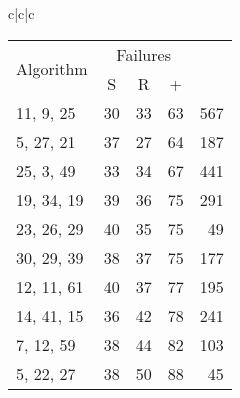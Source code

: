 \documentclass{acmsmalltr}
\newcommand{\xst}[3]{#1, #2, #3}
\begin{document}
\begin{sidewaystable}
{\begin{tabular}{c|c|c}
\begin{tabular}{l|rr|r|r}
\multirow{2}{*}{Algorithm} & \multicolumn{3}{c|}{Failures}  & \multirow{2}{*}{}\\
& \multicolumn{1}{c}{S} & \multicolumn{1}{c|}{R} & \multicolumn{1}{c|}{+} \\
\hline
\xst{11}{9}{25} & 30 & 33 & 63 & 567\\
\xst{5}{27}{21} & 37 & 27 & 64 & 187\\
\xst{25}{3}{49} & 33 & 34 & 67 & 441\\
\xst{19}{34}{19} & 39 & 36 & 75 & 291\\
\xst{23}{26}{29} & 40 & 35 & 75 & 49\\
\xst{30}{29}{39} & 38 & 37 & 75 & 177\\
\xst{12}{11}{61} & 40 & 37 & 77 & 195\\
\xst{14}{41}{15} & 36 & 42 & 78 & 241\\
\xst{7}{12}{59} & 38 & 44 & 82 & 103\\
\xst{5}{22}{27} & 38 & 50 & 88 & 45\\
\end{tabular}
\end{tabular}}
\end{sidewaystable}
\end{document}
